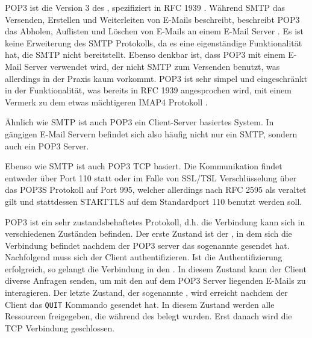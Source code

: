 POP3 ist die Version 3 des , spezifiziert in RFC 1939 . Während SMTP das Versenden, Erstellen und Weiterleiten von E-Mails beschreibt, beschreibt POP3 das Abholen, Auflisten und Löschen von E-Mails an einem E-Mail Server . Es ist keine Erweiterung des SMTP Protokolls, da es eine eigenständige Funktionalität hat, die SMTP nicht bereitstellt. Ebenso denkbar ist, dass POP3 mit einem E-Mail Server verwendet wird, der nicht SMTP zum Versenden benutzt, was allerdings in der Praxis kaum vorkommt. POP3 ist sehr simpel und eingeschränkt in der Funktionalität, was bereits in RFC 1939 angesprochen wird, mit einem Vermerk zu dem etwas mächtigeren IMAP4 Protokoll .

Ähnlich wie SMTP ist auch POP3 ein Client-Server basiertes System. In gängigen E-Mail Servern befindet sich also häufig nicht nur ein SMTP, sondern auch ein POP3 Server.

Ebenso wie SMTP ist auch POP3 TCP basiert. Die Kommunikation findet entweder über Port 110  statt oder im Falle von SSL/TSL Verschlüsselung über das POP3S Protokoll auf Port 995, welcher allerdings nach RFC 2595  als veraltet gilt und stattdessen STARTTLS auf dem Standardport 110 benutzt werden soll.

POP3 ist ein sehr zustandsbehaftetes Protokoll, d.h. die Verbindung kann sich in verschiedenen Zuständen befinden. Der erste Zustand ist der , in dem sich die Verbindung befindet nachdem der POP3 server das sogenannte  gesendet hat. Nachfolgend muss sich der Client authentifizieren. Ist die Authentifizierung erfolgreich, so gelangt die Verbindung in den . In diesem Zustand kann der Client diverse Anfragen senden, um mit den auf dem POP3 Server liegenden E-Mails zu interagieren. Der letzte Zustand, der sogenannte , wird erreicht nachdem der Client das \verb#QUIT# Kommando gesendet hat. In diesem Zustand werden alle Ressourcen freigegeben, die während des  belegt wurden. Erst danach wird die TCP Verbindung geschlossen. 

